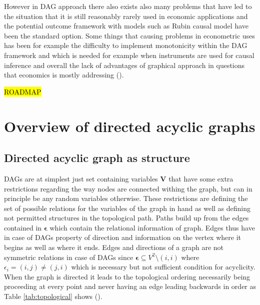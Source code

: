 \documentclass[main=english,12pt,a4paper,pdftex,econ,utf8]{aaltothesis}
\newcommand{\e}{\bm{\epsilon}}
\newcommand{\vars}{\bm{V}}
\begin{document}
However in DAG approach there also exists also many problems that have led to the situation that it is still reasonably rarely used in economic applications and the potential outcome framework with models such as Rubin causal model have been the standard option. Some things that causing problems in econometric uses has been for example the difficulty to implement monotonicity within the DAG framework and which is needed for example when instruments are used for causal inference and overall the lack of advantages of graphical approach in questions that economics is mostly addressing (\cite{Imbens2014}).

\noindent \hl{ROADMAP}

\clearpage

\section{Overview of directed acyclic graphs} \label{section:overview}

\subsection{Directed acyclic graph as structure}

DAGs are at simplest just set containing variables $\vars$ that have some extra restrictions regarding the way nodes are connected withing the graph, but can in principle be any random variables otherwise. These restrictions are defining the set of possible relations for the variables of the graph in hand as well as defining not permitted structures in the topological path. Paths build up from the edges contained in $\e$ which contain the relational information of graph. Edges thus have in case of DAGs property of direction and information on the vertex where it begins as well as where it ends. Edges and directions of a graph are not symmetric relations in case of DAGs since $\e\subseteq V^2\setminus(i,i)$ where $\epsilon_i=(i,j)\neq(j,i)$ which is necessary but not sufficient condition for acyclicity. When the graph is directed it leads to the topological ordering necessarily being proceeding at every point and never having an edge leading backwards in order as Table \ref{tab:topological} shows (\cite{Peters2017}).


\end{document}
